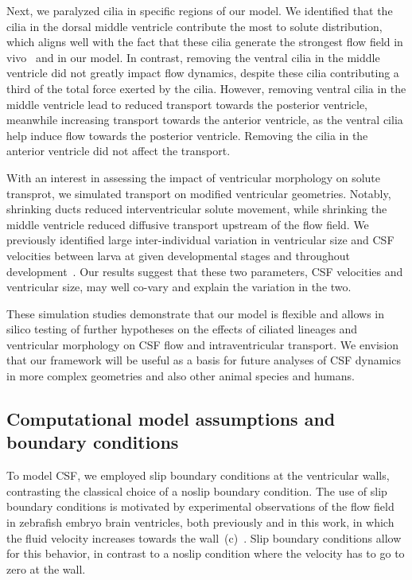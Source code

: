 \documentclass{WileyMSP-template}
\begin{document}
Next, we paralyzed cilia in specific regions of
our model. We identified that the cilia in the dorsal middle ventricle contribute
the most to solute distribution, which aligns well with the fact
that these cilia generate the strongest flow field in vivo~\cite{Olstad2019CiliaryDevelopment}
and in our model. In contrast, removing the ventral cilia in the middle ventricle
did not greatly impact flow dynamics, despite these cilia contributing a third of
the total force exerted by the cilia. However, removing ventral cilia in the middle ventricle
lead to reduced transport towards the posterior ventricle,
meanwhile increasing transport towards the anterior ventricle,
as the ventral cilia help induce flow towards the posterior ventricle.
Removing the cilia in the anterior ventricle did not affect the transport.

With an interest in assessing the impact of ventricular morphology on solute transprot,
we simulated transport on modified ventricular geometries.
Notably, shrinking ducts reduced interventricular solute movement, while shrinking
the middle ventricle reduced diffusive transport upstream of the flow field.
We previously identified large inter-individual variation in ventricular size and
CSF velocities between larva at given developmental stages and throughout
development~\cite{Olstad2019CiliaryDevelopment, DGama2025MotileBrain, Jeong2024TheZebrafish}.
Our results suggest that these two parameters, CSF velocities and ventricular size,
may well co-vary and explain the variation in the two.

These simulation studies demonstrate that our model is flexible and allows in silico
testing of further hypotheses on the effects of ciliated
lineages and ventricular morphology on CSF flow and intraventricular transport.
We envision that our framework will be useful as a basis for future analyses of
CSF dynamics in more complex geometries and also other animal species and humans.

\subsection{Computational model assumptions and boundary conditions}
To model CSF, we employed slip boundary conditions at the ventricular walls,
contrasting the classical choice of a noslip boundary condition.
The use of slip boundary conditions is motivated by experimental observations of the
flow field in zebrafish embryo brain ventricles, both previously and in this work, in which
the fluid velocity increases towards the
wall~(c)~\cite{Olstad2019CiliaryDevelopment}. Slip boundary
conditions allow for this behavior, in contrast to a noslip condition where the velocity
has to go to zero at the wall.
\end{document}
